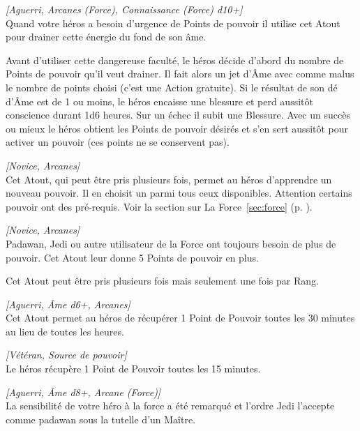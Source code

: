\begin{description}[align=left]
    \item [Drain de l’\^ame]
        \emph{[Aguerri, Arcanes (Force), Connaissance (Force) d10+]}\\
        Quand votre héros a besoin d’urgence de Points de pouvoir il utilise cet Atout pour drainer cette énergie du fond de son âme. 

        Avant d’utiliser cette dangereuse faculté, le héros décide d’abord du nombre de Points de pouvoir qu’il veut drainer. Il fait alors un jet d’\^Ame avec comme malus le nombre de points choisi (c’est une Action gratuite). Si le résultat de son dé d’\^Ame est de 1 ou moins, le héros encaisse une blessure et perd aussitôt conscience durant 1d6 heures. Sur un échec il subit une Blessure. Avec un succès ou mieux le héros obtient les Points de pouvoir désirés et s’en sert aussitôt pour activer un pouvoir (ces points ne se conservent pas).

    \item [Nouveau pouvoir]
        \emph{[Novice, Arcanes]}\\
        Cet Atout, qui peut être pris plusieurs fois, permet au héros d’apprendre un nouveau pouvoir. Il en choisit un parmi tous ceux disponibles. Attention certains pouvoir ont des pré-requis. Voir la section sur La Force~\ref{sec:force} (p. \pageref{sec:force}).

    \item [Points de pouvoir]
        \emph{[Novice, Arcanes]}\\
        Padawan, Jedi ou autre utilisateur de la Force ont toujours besoin de plus de pouvoir. Cet Atout leur donne 5 Points de pouvoir en plus.

        Cet Atout peut être pris plusieurs fois mais seulement une fois par Rang.

    \item [Source de pouvoir]
        \emph{[Aguerri, Âme d6+, Arcanes]}\\
        Cet Atout permet au héros de récupérer 1 Point de Pouvoir toutes les 30 minutes au lieu de toutes les heures.

    \item [Grande source de pouvoir]
        \emph{[Vétéran, Source de pouvoir]}\\
        Le héros récupère 1 Point de Pouvoir toutes les 15 minutes.

    \item [Padawan]
        \emph{[Aguerri, \^Ame d8+, Arcane (Force)]}\\
        La sensibilité de votre héro à la force a été remarqué et l’ordre Jedi l’accepte comme padawan sous la tutelle d’un Maître. 


\end{description}
